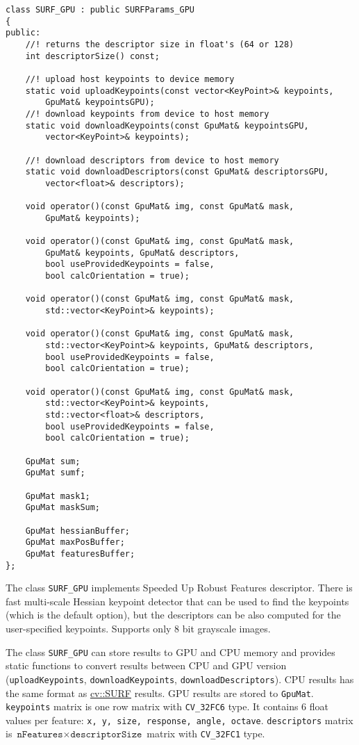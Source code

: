 \begin{lstlisting}
class SURF_GPU : public SURFParams_GPU
{
public:
    //! returns the descriptor size in float's (64 or 128)
    int descriptorSize() const;

    //! upload host keypoints to device memory
    static void uploadKeypoints(const vector<KeyPoint>& keypoints, 
        GpuMat& keypointsGPU);
    //! download keypoints from device to host memory
    static void downloadKeypoints(const GpuMat& keypointsGPU, 
        vector<KeyPoint>& keypoints);

    //! download descriptors from device to host memory
    static void downloadDescriptors(const GpuMat& descriptorsGPU, 
        vector<float>& descriptors);
    
    void operator()(const GpuMat& img, const GpuMat& mask, 
        GpuMat& keypoints);
    
    void operator()(const GpuMat& img, const GpuMat& mask, 
        GpuMat& keypoints, GpuMat& descriptors, 
        bool useProvidedKeypoints = false, 
        bool calcOrientation = true);

    void operator()(const GpuMat& img, const GpuMat& mask, 
        std::vector<KeyPoint>& keypoints);

    void operator()(const GpuMat& img, const GpuMat& mask, 
        std::vector<KeyPoint>& keypoints, GpuMat& descriptors, 
        bool useProvidedKeypoints = false, 
        bool calcOrientation = true);
    
    void operator()(const GpuMat& img, const GpuMat& mask, 
        std::vector<KeyPoint>& keypoints, 
        std::vector<float>& descriptors, 
        bool useProvidedKeypoints = false, 
        bool calcOrientation = true);

    GpuMat sum;
    GpuMat sumf;

    GpuMat mask1;
    GpuMat maskSum;

    GpuMat hessianBuffer;
    GpuMat maxPosBuffer;
    GpuMat featuresBuffer;
};
\end{lstlisting}

The class \texttt{SURF\_GPU} implements Speeded Up Robust Features descriptor. There is fast multi-scale Hessian keypoint detector that can be used to find the keypoints (which is the default option), but the descriptors can be also computed for the user-specified keypoints. Supports only 8 bit grayscale images.

The class \texttt{SURF\_GPU} can store results to GPU and CPU memory and provides static functions to convert results between CPU and GPU version (\texttt{uploadKeypoints}, \texttt{downloadKeypoints}, \texttt{downloadDescriptors}). CPU results has the same format as \hyperref[cv.class.SURF]{cv::SURF} results. GPU results are stored to \texttt{GpuMat}. \texttt{keypoints} matrix is one row matrix with \texttt{CV\_32FC6} type. It contains 6 float values per feature: \texttt{x, y, size, response, angle, octave}. \texttt{descriptors} matrix is $\texttt{nFeatures} \times \texttt{descriptorSize}$ matrix with \texttt{CV\_32FC1} type.

